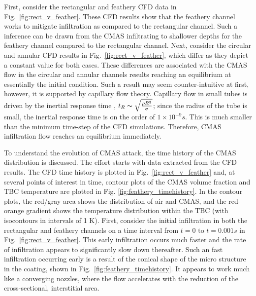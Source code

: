 \documentclass[%
 aip,
 amsmath,amssymb,
 reprint,%
]{revtex4-1}
\begin{document}
First, consider the rectangular and feathery CFD data in Fig.~\ref{fig:rect_v_feather}.
These CFD results show that the feathery channel works to mitigate infiltration as compared to the rectangular channel. Such a inference can be drawn from the CMAS infiltrating to shallower depths for the feathery channel compared to the rectangular channel. Next, consider the circular and annular CFD results in Fig.~\ref{fig:rect_v_feather}, which differ as they depict a constant value for both cases.
These differences are associated with the CMAS flow in the circular and annular channels results reaching an equilibrium at essentially the initial condition. 
Such a result may seem counter-intuitive at first, however, it is supported by capillary flow theory.
Capillary flow in small tubes is driven by the inertial response time \cite{Weislogel}, $t_{R}  \thicksim \sqrt{\frac{\rho R^{3}}{\sigma}}$; since the radius of the tube is small, the inertial response time is on the order of $1\times 10^{-9} s$. This is much smaller than the minimum time-step of the CFD simulations.
Therefore, CMAS infiltration flow reaches an equilibrium  immediately.


To understand the evolution of CMAS attack, the time history of the CMAS distribution is discussed. 
The effort starts with data extracted from the CFD results. The CFD time history is plotted in Fig.~\ref{fig:rect_v_feather} and, at several points of interest in time, contour plots of the CMAS volume fraction and TBC temperature are plotted in Fig. \ref{fig:feathery_timehistory}. In the contour plots, the red/gray area shows the distribution of air and CMAS, and the red-orange gradient shows the temperature distribution within the TBC (with isocontours in intervals of 1 K). First, consider the initial infiltration in both the rectangular and feathery channels on a time interval from $t=0$ to $t=0.001 s$ in Fig.~\ref{fig:rect_v_feather}.
This early infiltration occurs much faster and the rate of infiltration appears to significantly slow down thereafter. 
Such an fast infiltration occurring early is a result of the conical shape of the micro structure in the coating, shown in Fig.~\ref{fig:feathery_timehistory}. It appears to work much like a converging nozzles, where the flow accelerates with the reduction of the cross-sectional, interstitial area. 
\end{document}
